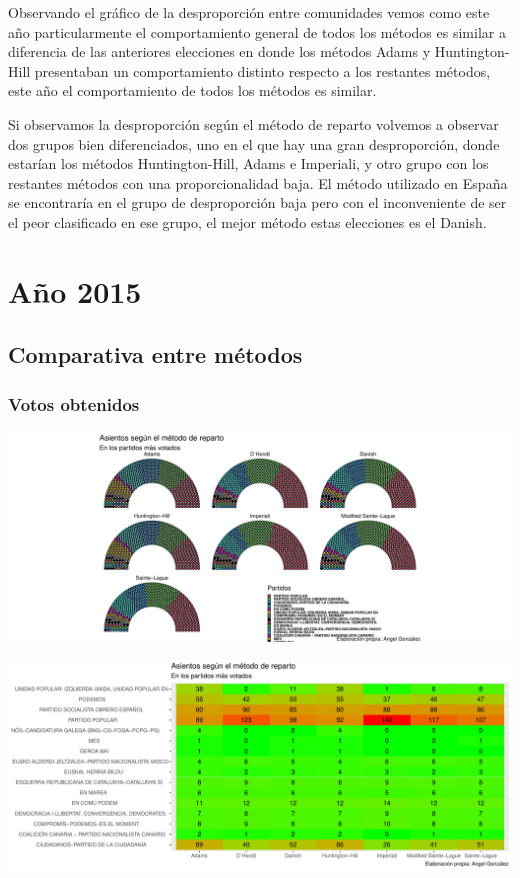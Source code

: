 \documentclass[12pt,a4paper,]{book}
\numberwithin{dummy}{section}
\theoremstyle{ocrenumbox}
\theoremstyle{blacknumex}
\theoremstyle{blacknumbox}
\theoremstyle{ocrenum}
\theoremstyle{ocrenum}
\begin{document}
Observando el gráfico de la desproporción entre comunidades vemos como
este año particularmente el comportamiento general de todos los métodos
es similar a diferencia de las anteriores elecciones en donde los
métodos Adams y Huntington-Hill presentaban un comportamiento distinto
respecto a los restantes métodos, este año el comportamiento de todos
los métodos es similar.

Si observamos la desproporción según el método de reparto volvemos a
observar dos grupos bien diferenciados, uno en el que hay una gran
desproporción, donde estarían los métodos Huntington-Hill, Adams e
Imperiali, y otro grupo con los restantes métodos con una
proporcionalidad baja. El método utilizado en España se encontraría en
el grupo de desproporción baja pero con el inconveniente de ser el peor
clasificado en ese grupo, el mejor método estas elecciones es el Danish.

\hypertarget{auxf1o-2015}{%
\section{Año 2015}\label{auxf1o-2015}}

\hypertarget{comparativa-entre-muxe9todos-11}{%
\subsection{Comparativa entre
métodos}\label{comparativa-entre-muxe9todos-11}}

\hypertarget{votos-obtenidos-11}{%
\subsubsection{Votos obtenidos}\label{votos-obtenidos-11}}

\begin{center}\includegraphics[width=0.95\linewidth]{figurasR/unnamed-chunk-110-1} \end{center}

\begin{center}\includegraphics[width=0.95\linewidth]{figurasR/unnamed-chunk-110-2} \end{center}
\end{document}
